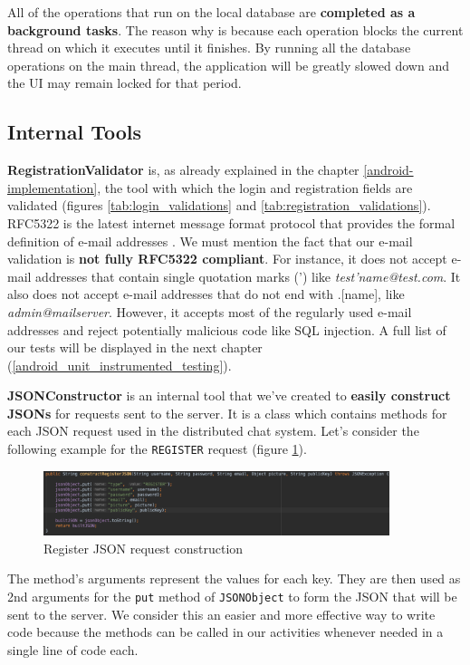 All of the operations that run on the local database are \textbf{completed as a background tasks}. The reason why is because each operation blocks the current thread on which it executes until it finishes. By running all the database operations on the main thread, the application will be greatly slowed down and the UI may remain locked for that period.

\subsection{Internal Tools}

\textbf{RegistrationValidator} is, as already explained in the chapter \ref{android-implementation}, the tool with which the login and registration fields are validated (figures \ref{tab:login_validations} and \ref{tab:registration_validations}). RFC5322 is the latest internet message format protocol that provides the formal definition of e-mail addresses \cite{RFC8322-e-mail}. We must mention the fact that our e-mail validation is \textbf{not fully RFC5322 compliant}. For instance, it does not accept e-mail addresses that contain single quotation marks (') like {\it{test'name@test.com}}. It also does not accept e-mail addresses that do not end with .[name], like {\it{admin@mailserver}}. However, it accepts most of the regularly used e-mail addresses and reject potentially malicious code like SQL injection. A full list of our tests will be displayed in the next chapter (\ref{android_unit_instrumented_testing}).

\textbf{JSONConstructor} is an internal tool that we've created to \textbf{easily construct JSONs} for requests sent to the server. It is a class which contains methods for each JSON request used in the distributed chat system. Let's consider the following example for the \verb|REGISTER| request (figure \ref{jsonConstructExample}).

\begin{figure}[H]
 \centering
  \includegraphics[width=0.9\textwidth]{images/JSONConstruct.png}
  \caption{Register JSON request construction}
  \label{jsonConstructExample}
\end{figure}

The method's arguments represent the values for each key. They are then used as 2nd arguments for the \verb|put| method of \verb|JSONObject| to form the JSON that will be sent to the server. We consider this an easier and more effective way to write code because the methods can be called in our activities whenever needed in a single line of code each.

